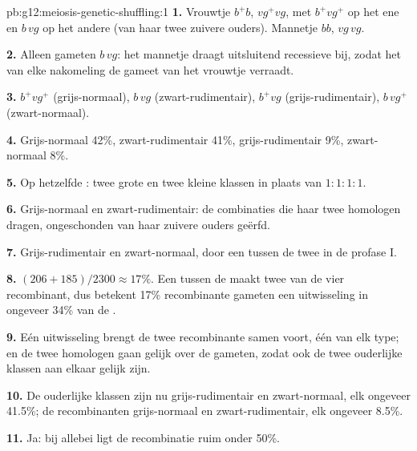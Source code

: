 \begin{solution}{pb:g12:meiosis-genetic-shuffling:1}
\textbf{1.} Vrouwtje $b^+b$, $vg^+vg$, met $b^+vg^+$ op het ene 
en $b\,vg$ op het andere (van haar twee zuivere ouders). Mannetje $bb$,
$vg\,vg$.

\textbf{2.} Alleen gameten $b\,vg$: het mannetje draagt uitsluitend
recessieve  bij, zodat het  van elke nakomeling de gameet
van het vrouwtje verraadt.

\textbf{3.} $b^+vg^+$ (grijs-normaal), $b\,vg$ (zwart-rudimentair),
$b^+vg$ (grijs-rudimentair), $b\,vg^+$ (zwart-normaal).

\textbf{4.} Grijs-normaal 42\%, zwart-rudimentair 41\%, grijs-rudimentair
9\%, zwart-normaal 8\%.

\textbf{5.} Op hetzelfde : twee grote en twee kleine klassen in
plaats van $1:1:1:1$.

\textbf{6.} Grijs-normaal en zwart-rudimentair: de combinaties die haar
twee homologen dragen, ongeschonden van haar zuivere ouders geërfd.

\textbf{7.} Grijs-rudimentair en zwart-normaal, door een 
tussen de twee  in de profase I.

\textbf{8.} $(206 + 185)/2300 \approx 17\%$. Een  tussen de
 maakt twee van de vier  recombinant, dus betekent 17\%
recombinante gameten een uitwisseling in ongeveer 34\% van de .

\textbf{9.} Eén uitwisseling brengt de twee recombinante 
samen voort, één van elk type; en de twee homologen gaan gelijk over de
gameten, zodat ook de twee ouderlijke klassen aan elkaar gelijk zijn.

\textbf{10.} De ouderlijke klassen zijn nu grijs-rudimentair en
zwart-normaal, elk ongeveer 41.5\%; de recombinanten grijs-normaal en
zwart-rudimentair, elk ongeveer 8.5\%.

\textbf{11.} Ja: bij allebei ligt de recombinatie ruim onder 50\%.


\end{solution}
